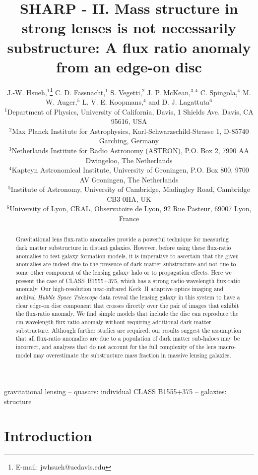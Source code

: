 \documentclass[a4paper,fleqn,usenatbib,useAMS]{mnras}
\title[Beware the effect of edge-on discs]{SHARP - II. Mass structure in strong lenses is not necessarily substructure: A flux ratio anomaly from an edge-on disc }
\author[Hsueh et al.]{J.-W. Hsueh,$^{1}$\thanks{E-mail: jwhsueh@ucdavis.edu} C. D. Fassnacht,$^{1}$ S. Vegetti,$^{2}$  J. P. McKean,$^{3,4}$ C. Spingola,$^{4}$ M. W. Auger,$^{5}$
\newauthor  L. V. E. Koopmans,$^{4}$ and D. J. Lagattuta$^{6}$\\
$^{1}$Department of Physics, University of California, Davis, 1 Shields Ave. Davis, CA 95616, USA\\
$^{2}$Max Planck Institute for Astrophysics, Karl-Schwarzschild-Strasse 1, D-85740 Garching, Germany\\
$^{3}$Netherlands Institute for Radio Astronomy (ASTRON), P.O. Box 2, 7990 AA Dwingeloo, The Netherlands\\
$^{4}$Kapteyn Astronomical Institute, University of Groningen, P.O. Box 800, 9700 AV Groningen, The Netherlands\\
$^{5}$Institute of Astronomy, University of Cambridge, Madingley Road, Cambridge CB3 0HA, UK\\
$^{6}$University of Lyon, CRAL, Observatoire de Lyon, 92 Rue Pasteur, 69007 Lyon, France}
\begin{document}

\pagerange{\pageref{firstpage}--\pageref{lastpage}} 

\maketitle

\label{firstpage}

\begin{abstract}
Gravitational lens flux-ratio anomalies provide a powerful technique for measuring dark matter substructure in distant galaxies. However, before using these flux-ratio anomalies to test galaxy formation models, it is imperative to ascertain that the given anomalies are indeed due to the presence of dark matter substructure and not due to some other component of the lensing galaxy halo or to propagation effects. Here we present the case of CLASS~B1555+375, which has a strong radio-wavelength flux-ratio anomaly.  Our high-resolution near-infrared Keck~II adaptive optics imaging and archival {\it Hubble Space Telescope} data reveal the lensing galaxy in this system to have  a clear edge-on disc component that crosses directly over the pair of images that exhibit the flux-ratio anomaly. We find simple models that include the disc can reproduce the cm-wavelength flux-ratio anomaly without requiring additional dark matter substructure. Although further studies are required, our results suggest the assumption that all flux-ratio anomalies are due to a population of dark matter sub-haloes may be incorrect, and analyses that do not account for the full complexity of the lens macro-model may overestimate the substructure mass fraction in massive lensing galaxies.
\end{abstract}

\begin{keywords}
gravitational lensing -- quasars: individual CLASS B1555+375 -- galaxies: structure 
\end{keywords}

\section{Introduction}
\end{document}
